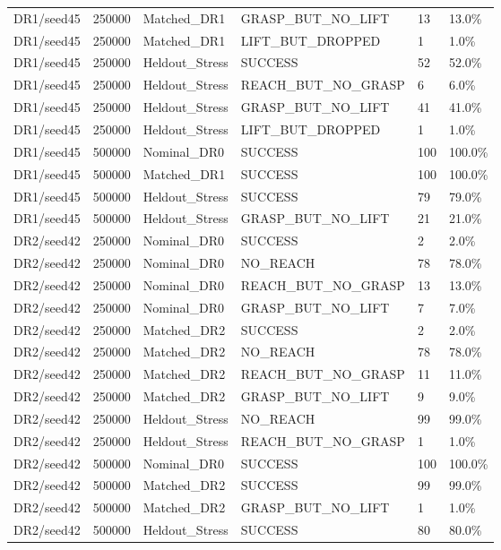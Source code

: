 \documentclass[11pt,a4paper,oneside]{book}
\begin{document}
\begin{longtable}{l l l l l l}
DR1/seed45 & 250000 & Matched\_DR1 & GRASP\_BUT\_NO\_LIFT & 13 & 13.0\% \\
DR1/seed45 & 250000 & Matched\_DR1 & LIFT\_BUT\_DROPPED & 1 & 1.0\% \\
DR1/seed45 & 250000 & Heldout\_Stress & SUCCESS & 52 & 52.0\% \\
DR1/seed45 & 250000 & Heldout\_Stress & REACH\_BUT\_NO\_GRASP & 6 & 6.0\% \\
DR1/seed45 & 250000 & Heldout\_Stress & GRASP\_BUT\_NO\_LIFT & 41 & 41.0\% \\
DR1/seed45 & 250000 & Heldout\_Stress & LIFT\_BUT\_DROPPED & 1 & 1.0\% \\
DR1/seed45 & 500000 & Nominal\_DR0 & SUCCESS & 100 & 100.0\% \\
DR1/seed45 & 500000 & Matched\_DR1 & SUCCESS & 100 & 100.0\% \\
DR1/seed45 & 500000 & Heldout\_Stress & SUCCESS & 79 & 79.0\% \\
DR1/seed45 & 500000 & Heldout\_Stress & GRASP\_BUT\_NO\_LIFT & 21 & 21.0\% \\
DR2/seed42 & 250000 & Nominal\_DR0 & SUCCESS & 2 & 2.0\% \\
DR2/seed42 & 250000 & Nominal\_DR0 & NO\_REACH & 78 & 78.0\% \\
DR2/seed42 & 250000 & Nominal\_DR0 & REACH\_BUT\_NO\_GRASP & 13 & 13.0\% \\
DR2/seed42 & 250000 & Nominal\_DR0 & GRASP\_BUT\_NO\_LIFT & 7 & 7.0\% \\
DR2/seed42 & 250000 & Matched\_DR2 & SUCCESS & 2 & 2.0\% \\
DR2/seed42 & 250000 & Matched\_DR2 & NO\_REACH & 78 & 78.0\% \\
DR2/seed42 & 250000 & Matched\_DR2 & REACH\_BUT\_NO\_GRASP & 11 & 11.0\% \\
DR2/seed42 & 250000 & Matched\_DR2 & GRASP\_BUT\_NO\_LIFT & 9 & 9.0\% \\
DR2/seed42 & 250000 & Heldout\_Stress & NO\_REACH & 99 & 99.0\% \\
DR2/seed42 & 250000 & Heldout\_Stress & REACH\_BUT\_NO\_GRASP & 1 & 1.0\% \\
DR2/seed42 & 500000 & Nominal\_DR0 & SUCCESS & 100 & 100.0\% \\
DR2/seed42 & 500000 & Matched\_DR2 & SUCCESS & 99 & 99.0\% \\
DR2/seed42 & 500000 & Matched\_DR2 & GRASP\_BUT\_NO\_LIFT & 1 & 1.0\% \\
DR2/seed42 & 500000 & Heldout\_Stress & SUCCESS & 80 & 80.0\% \\

\end{longtable}
\end{document}

